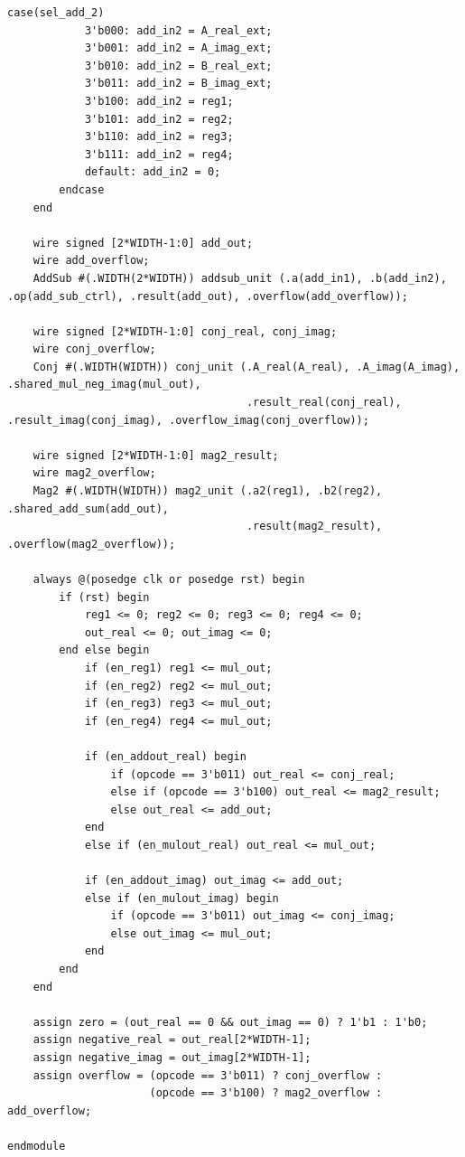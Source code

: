 \documentclass[11pt,a4paper]{article}
\begin{document}
\begin{LTR}
\begin{lstlisting}[title={\rl{کد پیمانه مسیر داده}}]
        case(sel_add_2)
            3'b000: add_in2 = A_real_ext;
            3'b001: add_in2 = A_imag_ext;
            3'b010: add_in2 = B_real_ext;
            3'b011: add_in2 = B_imag_ext;
            3'b100: add_in2 = reg1;
            3'b101: add_in2 = reg2;
            3'b110: add_in2 = reg3;
            3'b111: add_in2 = reg4;
            default: add_in2 = 0;
        endcase
    end

    wire signed [2*WIDTH-1:0] add_out;
    wire add_overflow;
    AddSub #(.WIDTH(2*WIDTH)) addsub_unit (.a(add_in1), .b(add_in2), .op(add_sub_ctrl), .result(add_out), .overflow(add_overflow));

    wire signed [2*WIDTH-1:0] conj_real, conj_imag;
    wire conj_overflow;
    Conj #(.WIDTH(WIDTH)) conj_unit (.A_real(A_real), .A_imag(A_imag), .shared_mul_neg_imag(mul_out),
                                     .result_real(conj_real), .result_imag(conj_imag), .overflow_imag(conj_overflow));

    wire signed [2*WIDTH-1:0] mag2_result;
    wire mag2_overflow;
    Mag2 #(.WIDTH(WIDTH)) mag2_unit (.a2(reg1), .b2(reg2), .shared_add_sum(add_out),
                                     .result(mag2_result), .overflow(mag2_overflow));

    always @(posedge clk or posedge rst) begin
        if (rst) begin
            reg1 <= 0; reg2 <= 0; reg3 <= 0; reg4 <= 0;
            out_real <= 0; out_imag <= 0;
        end else begin
            if (en_reg1) reg1 <= mul_out;
            if (en_reg2) reg2 <= mul_out;
            if (en_reg3) reg3 <= mul_out;
            if (en_reg4) reg4 <= mul_out;

            if (en_addout_real) begin
                if (opcode == 3'b011) out_real <= conj_real;
                else if (opcode == 3'b100) out_real <= mag2_result;
                else out_real <= add_out;
            end
            else if (en_mulout_real) out_real <= mul_out;

            if (en_addout_imag) out_imag <= add_out;
            else if (en_mulout_imag) begin
                if (opcode == 3'b011) out_imag <= conj_imag;
                else out_imag <= mul_out;
            end
        end
    end

    assign zero = (out_real == 0 && out_imag == 0) ? 1'b1 : 1'b0;
    assign negative_real = out_real[2*WIDTH-1]; 
    assign negative_imag = out_imag[2*WIDTH-1];
    assign overflow = (opcode == 3'b011) ? conj_overflow :
                      (opcode == 3'b100) ? mag2_overflow : add_overflow;

endmodule
\end{lstlisting}
\end{LTR}
\end{document}
